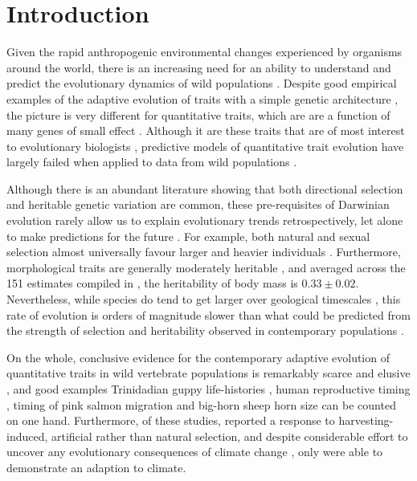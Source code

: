 \section[Introduction]{Introduction}

Given the rapid anthropogenic environmental changes experienced by organisms around the world, there is an increasing need for an ability to understand and predict the evolutionary dynamics of wild populations \parencite{parmesan2006,Merila2014}. Despite good empirical examples of the adaptive evolution of traits with a simple genetic architecture \parencite{vantHof2011,Karell2011,Lamichhaney2016}, the picture is very different for quantitative traits, which are are a function of many genes of small effect \parencite{Wellenreuther2016}. Although it are these traits that are of most interest to evolutionary biologists \parencite{Roff2007, Walsh2014}, predictive models of quantitative trait evolution have largely failed when applied to data from wild populations \parencite{Merila2001}. 

Although there is an abundant literature showing that both directional selection \parencite{Kingsolver2001, Kingsolver2012} and heritable genetic variation \parencite{Mousseau1987,Postma2014} are common, these pre-requisites of Darwinian evolution rarely allow us to explain evolutionary trends retrospectively, let alone to make predictions for the future \parencite{Merila2001, Morrissey2012sts}. For example, both natural and sexual selection almost universally favour larger and heavier individuals \parencite{Blanckenhorn2000}. Furthermore, morphological traits are generally moderately heritable \parencite{Mousseau1987, Postma2014}, and averaged across the 151 estimates compiled in \parencite{Postma2014}, the heritability of body mass is  $0.33\pm0.02$. Nevertheless, while species do tend to get larger over geological timescales \parencite{Cope1887,Alroy1998,Heim2014,Baker2015}, this rate of evolution is orders of magnitude slower than what could be predicted from the strength of selection and heritability observed in contemporary populations \parencite{Merila2001, Bell2010a, Gotanda2015}.

On the whole, conclusive evidence for the contemporary adaptive evolution of quantitative traits in wild vertebrate populations is remarkably scarce and elusive \parencite{Merila2001,Morrissey2012sts}, and good examples \textemdash Trinidadian guppy life-histories \parencite{Reznick1996}, human reproductive timing \parencite{Milot2011}, timing of pink salmon migration \parencite{Kovach2012} and big-horn sheep horn size \parencite{Pigeon2016}\textemdash can be counted on one hand. Furthermore, of these studies, \parencite{Pigeon2016} reported a response to harvesting-induced, artificial rather than natural selection, and despite considerable effort to uncover any evolutionary consequences of climate change \parencite{Charmantier2014climate,Gienapp2014,Merila2014,Crozier2014}, only \parencite{Kovach2012} were able to demonstrate an adaption to climate. 

